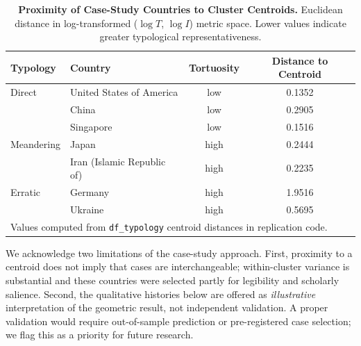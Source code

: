 \documentclass[12pt]{article}
\begin{document}
\begin{table}[htbp]
    \centering
    \caption{\textbf{Proximity of Case-Study Countries to Cluster Centroids.} Euclidean distance in log-transformed ($\log T$, $\log I$) metric space. Lower values indicate greater typological representativeness.}
    \label{tab:proximity}
    \begin{tabular}{llcc}
        \toprule
        Typology   & Country                    & Tortuosity & Distance to Centroid                                          \\
        \midrule
        Direct     & United States of America   & low        & 0.1352                                                        \\
                   & China                      & low        & 0.2905                                                        \\
                   & Singapore                  & low        & 0.1516                                                        \\
        \midrule
        Meandering & Japan                      & high       & 0.2444                                                        \\
                   & Iran (Islamic Republic of) & high       & 0.2235                                                        \\
        \midrule
        Erratic    & Germany                    & high       & 1.9516                                                        \\
                   & Ukraine                    & high       & 0.5695                                                        \\
        \bottomrule
        \multicolumn{4}{l}{\footnotesize Values computed from \texttt{df\_typology} centroid distances in replication code.} \\
    \end{tabular}
\end{table}

We acknowledge two limitations of the case-study approach. First, proximity to a centroid does not imply that cases are interchangeable; within-cluster variance is substantial and these countries were selected partly for legibility and scholarly salience. Second, the qualitative histories below are offered as \textit{illustrative} interpretation of the geometric result, not independent validation. A proper validation would require out-of-sample prediction or pre-registered case selection; we flag this as a priority for future research.
\end{document}
